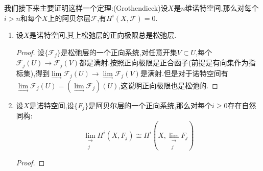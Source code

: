 我们接下来主要证明这样一个定理:(Grothendieck)设$X$是$n$维诺特空间,那么对每个$i>n$和每个$X$上的阿贝尔层$\mathscr{F}$,有$H^i(X,\mathscr{F})=0$.
\begin{enumerate}
	\item 设$X$是诺特空间,其上松弛层的正向极限总是松弛层.
	\begin{proof}
		
		设$\{\mathscr{F}_j\}$是松弛层的一个正向系统,对任意开集$V\subset U$,每个$\mathscr{F}_j(U)\to\mathscr{F}_j(V)$都是满射.按照正向极限是正合函子(前提是有向集作为指标集),得到$\lim\limits_{\rightarrow}\mathscr{F}_j(U)\to\lim\limits_{\rightarrow}\mathscr{F}_j(V)$是满射.但是对于诺特空间有$\lim\limits_{\rightarrow}\mathscr{F}_j(U)=(\lim\limits_{\rightarrow}\mathscr{F}_j)(U)$,这说明正向极限也是松弛的.
	\end{proof}
	\item 设$X$是诺特空间,设$\{F_j\}$是阿贝尔层的一个正向系统,那么对每个$i\ge0$存在自然同构:
	$$\lim\limits_{\substack{\rightarrow\\j}}H^i(X,F_j)\cong H^i(X,\lim\limits_{\substack{\rightarrow\\j}}F_j)$$
	\begin{proof}
		

\end{proof}
\end{enumerate}
